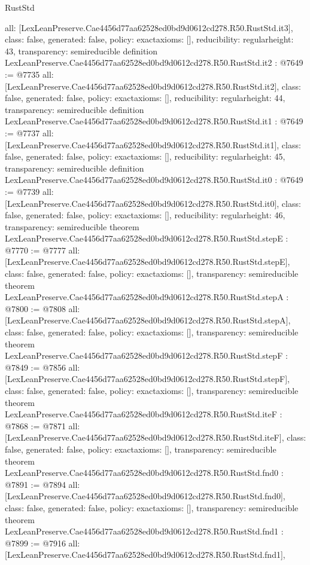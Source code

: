 \begin{lexlean}{RustStd}
\begin{coremodule}
{  all: [LexLeanPreserve.Cae4456d77aa62528ed0bd9d0612cd278.R50.RustStd.it3],
  class: false,
  generated: false,
  policy: exact{axioms: []},
  reducibility: regular{height: 43},
  transparency: semireducible
}
definition LexLeanPreserve.Cae4456d77aa62528ed0bd9d0612cd278.R50.RustStd.it2 : @7649 := @7735 {
  all: [LexLeanPreserve.Cae4456d77aa62528ed0bd9d0612cd278.R50.RustStd.it2],
  class: false,
  generated: false,
  policy: exact{axioms: []},
  reducibility: regular{height: 44},
  transparency: semireducible
}
definition LexLeanPreserve.Cae4456d77aa62528ed0bd9d0612cd278.R50.RustStd.it1 : @7649 := @7737 {
  all: [LexLeanPreserve.Cae4456d77aa62528ed0bd9d0612cd278.R50.RustStd.it1],
  class: false,
  generated: false,
  policy: exact{axioms: []},
  reducibility: regular{height: 45},
  transparency: semireducible
}
definition LexLeanPreserve.Cae4456d77aa62528ed0bd9d0612cd278.R50.RustStd.it0 : @7649 := @7739 {
  all: [LexLeanPreserve.Cae4456d77aa62528ed0bd9d0612cd278.R50.RustStd.it0],
  class: false,
  generated: false,
  policy: exact{axioms: []},
  reducibility: regular{height: 46},
  transparency: semireducible
}
theorem LexLeanPreserve.Cae4456d77aa62528ed0bd9d0612cd278.R50.RustStd.stepE : @7770 := @7777 {
  all: [LexLeanPreserve.Cae4456d77aa62528ed0bd9d0612cd278.R50.RustStd.stepE],
  class: false,
  generated: false,
  policy: exact{axioms: []},
  transparency: semireducible
}
theorem LexLeanPreserve.Cae4456d77aa62528ed0bd9d0612cd278.R50.RustStd.stepA : @7800 := @7808 {
  all: [LexLeanPreserve.Cae4456d77aa62528ed0bd9d0612cd278.R50.RustStd.stepA],
  class: false,
  generated: false,
  policy: exact{axioms: []},
  transparency: semireducible
}
theorem LexLeanPreserve.Cae4456d77aa62528ed0bd9d0612cd278.R50.RustStd.stepF : @7849 := @7856 {
  all: [LexLeanPreserve.Cae4456d77aa62528ed0bd9d0612cd278.R50.RustStd.stepF],
  class: false,
  generated: false,
  policy: exact{axioms: []},
  transparency: semireducible
}
theorem LexLeanPreserve.Cae4456d77aa62528ed0bd9d0612cd278.R50.RustStd.iteF : @7868 := @7871 {
  all: [LexLeanPreserve.Cae4456d77aa62528ed0bd9d0612cd278.R50.RustStd.iteF],
  class: false,
  generated: false,
  policy: exact{axioms: []},
  transparency: semireducible
}
theorem LexLeanPreserve.Cae4456d77aa62528ed0bd9d0612cd278.R50.RustStd.fnd0 : @7891 := @7894 {
  all: [LexLeanPreserve.Cae4456d77aa62528ed0bd9d0612cd278.R50.RustStd.fnd0],
  class: false,
  generated: false,
  policy: exact{axioms: []},
  transparency: semireducible
}
theorem LexLeanPreserve.Cae4456d77aa62528ed0bd9d0612cd278.R50.RustStd.fnd1 : @7899 := @7916 {
  all: [LexLeanPreserve.Cae4456d77aa62528ed0bd9d0612cd278.R50.RustStd.fnd1],
}
\end{coremodule}
\end{lexlean}
